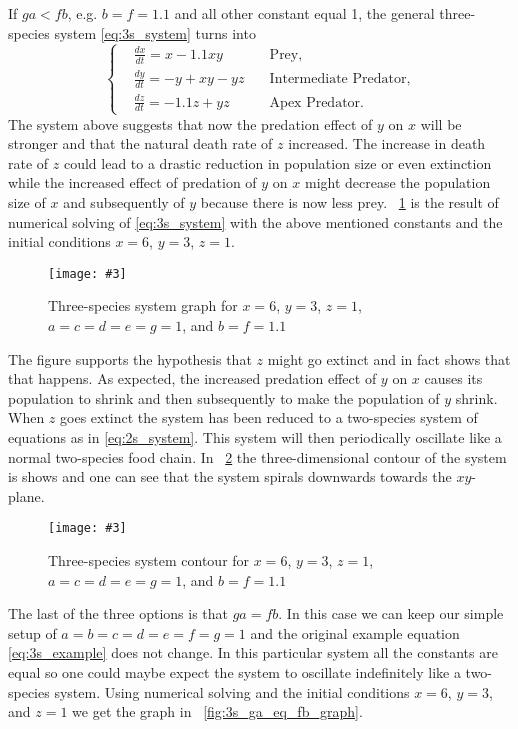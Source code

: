 \documentclass[12pt,a4paper,reqno]{amsart}
\newcommand{\figref}[1]{\textsc{\figurename}~\ref{#1}}
\newcommand{\makefig}[4]{
\begin{figure}[#1]
    \captionsetup{justification=centering}
    \texttt{[image: \#3]}
    \caption{#4}
    \label{fig:#3}
\end{figure}
}
\begin{document}
If $ga < fb$, e.g. $b=f=1.1$ and all other constant equal 1, the general
three-species system \eqref{eq:3s_system} turns into
\begin{equation}\nonumber
    \left\{\begin{aligned}
        &\frac{dx}{dt} = x - 1.1xy              &\text{Prey,}\\
        &\frac{dy}{dt} = -y + xy - yz \quad &\text{Intermediate Predator,}\\
        &\frac{dz}{dt} = -1.1z + yz             &\text{Apex Predator.}
    \end{aligned}\right.
\end{equation}
The system above suggests that now the predation effect of $y$ on $x$ will be
stronger and that the natural death rate of $z$ increased. The increase in
death rate of $z$ could lead to a drastic reduction in population size or even
extinction while the increased effect of predation of $y$ on $x$ might decrease
the population size of $x$ and subsequently of $y$ because there is now less
prey. \figref{fig:3s_ga_l_fb_graph} is the result of numerical solving of
\eqref{eq:3s_system} with the above mentioned constants and the initial
conditions $x=6$, $y=3$, $z=1$.
\makefig{h}{\textwidth}{3s_ga_l_fb_graph}{Three-species system graph for
$x=6$, $y=3$, $z=1$, $a=c=d=e=g=1$, and $b=f=1.1$}
The figure supports the hypothesis that $z$ might go extinct and in fact shows
that that happens. As expected, the increased predation effect of $y$ on $x$
causes its population to shrink and then subsequently to make the population of
$y$ shrink. When $z$ goes extinct the system has been reduced to a two-species
system of equations as in \eqref{eq:2s_system}. This system will then
periodically oscillate like a normal two-species food chain. In
\figref{fig:3s_ga_l_fb_contour} the three-dimensional contour of the system is
shows and one can see that the system spirals downwards towards the $xy$-plane.
\makefig{h}{0.8\textwidth}{3s_ga_l_fb_contour}{Three-species system contour for
$x=6$, $y=3$, $z=1$, $a=c=d=e=g=1$, and $b=f=1.1$}
\newpage

The last of the three options is that $ga = fb$. In this case we can keep our
simple setup of $a=b=c=d=e=f=g=1$ and the original example equation 
\eqref{eq:3s_example} does not change. In this particular system all the
constants are equal so one could maybe expect the system to oscillate
indefinitely like a two-species system. Using numerical solving and the initial
conditions $x=6$, $y=3$, and $z=1$ we get the graph in
\figref{fig:3s_ga_eq_fb_graph}. 
\end{document}

